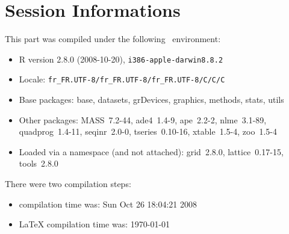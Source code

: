 \documentclass{article}
\begin{document}
\section*{Session Informations}

This part was compiled under the following \Rlogo{}~environment:

\begin{itemize}
  \item R version 2.8.0 (2008-10-20), \verb|i386-apple-darwin8.8.2|
  \item Locale: \verb|fr_FR.UTF-8/fr_FR.UTF-8/fr_FR.UTF-8/C/C/C|
  \item Base packages: base, datasets, grDevices, graphics, methods,
    stats, utils
  \item Other packages: MASS~7.2-44, ade4~1.4-9, ape~2.2-2,
    nlme~3.1-89, quadprog~1.4-11, seqinr~2.0-0, tseries~0.10-16,
    xtable~1.5-4, zoo~1.5-4
  \item Loaded via a namespace (and not attached): grid~2.8.0,
    lattice~0.17-15, tools~2.8.0
\end{itemize}
There were two compilation steps:

\begin{itemize}
  \item \Rlogo{} compilation time was: Sun Oct 26 18:04:21 2008
  \item \LaTeX{} compilation time was: \today
\end{itemize}


\clearpage
{}


\end{document}
